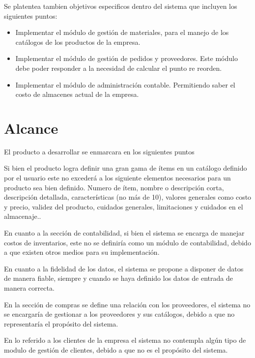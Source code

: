Se platentea tambien objetivos especificos dentro del sistema que incluyen los siguientes puntos:

\begin{itemize}
\item Implementar el módulo de gestión de materiales, para el manejo de los catálogos de los productos de la empresa.
\item Implementar el módulo de gestión de pedidos y proveedores. Este módulo debe poder responder a la necesidad de calcular el punto re reorden.
\item Implementar el módulo de administración contable. Permitiendo saber el costo de almacenes actual de la empresa.
\end{itemize}


\section{Alcance}

El producto a desarrollar se enmarcara en los siguientes puntos

Si bien el producto logra definir una gran gama de ítems en un catálogo definido por el usuario este no excederá a los siguiente elementos necesarios para un producto sea bien definido. Numero de ítem, nombre o descripción corta, descripción detallada, características (no más de 10), valores generales como costo y precio, validez del producto, cuidados generales, limitaciones y cuidados en el almacenaje..

En cuanto a la sección de contabilidad, si bien el sistema se encarga de manejar costos de inventarios, este no se definiría como un módulo de contabilidad, debido a que existen otros medios para su implementación.

En cuanto a la fidelidad de los datos, el sistema se propone a disponer de datos de manera fiable, siempre y cuando se haya definido los datos de entrada de manera correcta.

En la sección de compras se define una relación con los proveedores, el sistema no se encargaría de gestionar a los proveedores y sus catálogos, debido a que no representaría el propósito del sistema.

En  lo referido a los clientes de la empresa el sistema no contempla algún tipo de modulo de gestión de clientes, debido a que no es el propósito del sistema.


